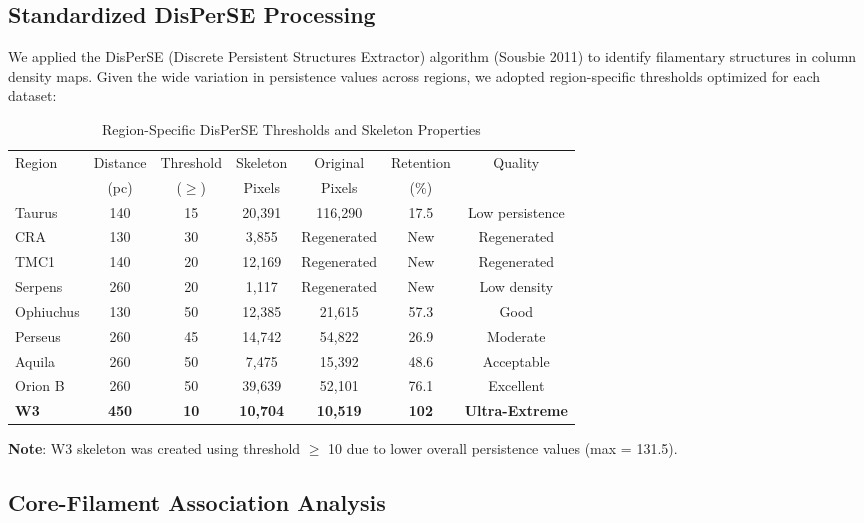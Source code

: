 \documentclass[11pt,a4paper]{article}
\begin{document}
\subsection{Standardized DisPerSE Processing}

We applied the DisPerSE (Discrete Persistent Structures Extractor) algorithm (Sousbie 2011) to identify filamentary structures in column density maps. Given the wide variation in persistence values across regions, we adopted region-specific thresholds optimized for each dataset:

\begin{table}[H]
\centering
\caption{Region-Specific DisPerSE Thresholds and Skeleton Properties}
\begin{tabular}{lcccccc}
\toprule
Region & Distance & Threshold & Skeleton & Original & Retention & Quality \\
      & (pc)   & ($\ge$) & Pixels  & Pixels  & (\%)  & \\
\midrule
Taurus   & 140     & 15  & 20,391   & 116,290  & 17.5  & Low persistence \\
CRA      & 130     & 30  & 3,855    & Regenerated & New     & Regenerated \\
TMC1     & 140     & 20  & 12,169   & Regenerated & New     & Regenerated \\
Serpens  & 260     & 20  & 1,117    & Regenerated & New     & Low density \\
Ophiuchus& 130     & 50  & 12,385   & 21,615  & 57.3   & Good \\
Perseus  & 260     & 45  & 14,742   & 54,822  & 26.9   & Moderate \\
Aquila   & 260     & 50  & 7,475    & 15,392  & 48.6   & Acceptable \\
Orion B  & 260     & 50  & 39,639   & 52,101  & 76.1   & Excellent \\
\textbf{W3}    & \textbf{450}     & \textbf{10}  & \textbf{10,704} & \textbf{10,519}  & \textbf{102} & \textbf{Ultra-Extreme} \\
\bottomrule
\end{tabular}
\end{table}

\noindent\textbf{Note}: W3 skeleton was created using threshold $\ge$ 10 due to lower overall persistence values (max = 131.5).

\subsection{Core-Filament Association Analysis}
\end{document}
